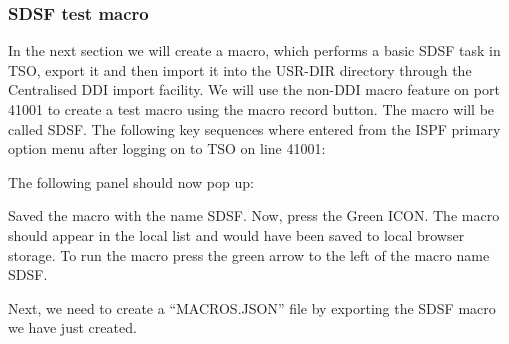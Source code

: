 \documentclass[letterpaper,10pt,english]{sphinxmanual}
\begin{document}
\subsubsection{SDSF test macro}
\label{\detokenize{Customization:sdsf-test-macro}}
In the next section we will create a macro, which performs a basic SDSF task in TSO, export it and then import it into the USR-DIR directory through the Centralised DDI import facility. We will use the non-DDI macro feature on port 41001 to create a test macro using the macro record button. The macro will be called SDSF. The following key sequences where entered from the ISPF primary option menu after logging on to TSO on line 41001:

\begin{sphinxVerbatim}[commandchars=\\\{\}]
          
        \PYG{p}{[}      \PYG{p}{]}
                                                          \PYG{p}{]}
                                                   
        
\end{sphinxVerbatim}

The following panel should now pop up:



Saved the macro with the name SDSF. Now, press the Green ICON. The macro should appear in the local list and would have been saved to local browser storage. To run the macro press the green arrow to the left of the macro name SDSF.


Next, we need to create a “MACROS.JSON” file by exporting the SDSF macro we have just created.

\ignorespaces 
\end{document}
